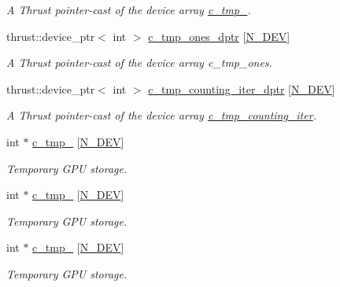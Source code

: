 \begin{DoxyCompactItemize}
\begin{DoxyCompactList}\small\item\em A Thrust pointer-\/cast of the device array \hyperlink{classMesh_af5270c410a5690f1763f5d593d0c9e35}{c\+\_\+tmp\+\_}. \end{DoxyCompactList}\item 
thrust\+::device\+\_\+ptr$<$ int $>$ \hyperlink{classMesh_a8112720b857381575b8c9c79983df670}{c\+\_\+tmp\+\_\+ones\+\_\+dptr} \mbox{[}\hyperlink{cppspec_8h_a2b674dab7a14f1bf32b48b7fda5022dc}{N\+\_\+\+D\+EV}\mbox{]}
\begin{DoxyCompactList}\small\item\em A Thrust pointer-\/cast of the device array c\+\_\+tmp\+\_\+ones. \end{DoxyCompactList}\item 
thrust\+::device\+\_\+ptr$<$ int $>$ \hyperlink{classMesh_a5d58a50232053a9d1991c812513deb14}{c\+\_\+tmp\+\_\+counting\+\_\+iter\+\_\+dptr} \mbox{[}\hyperlink{cppspec_8h_a2b674dab7a14f1bf32b48b7fda5022dc}{N\+\_\+\+D\+EV}\mbox{]}
\begin{DoxyCompactList}\small\item\em A Thrust pointer-\/cast of the device array \hyperlink{classMesh_a0db99bf87d3b79d642e99a7ffe23c6b5}{c\+\_\+tmp\+\_\+counting\+\_\+iter}. \end{DoxyCompactList}\item 
int $\ast$ \hyperlink{classMesh_a2d6d66223791e211c83a72f9114f8845}{c\+\_\+tmp\+\_} \mbox{[}\hyperlink{cppspec_8h_a2b674dab7a14f1bf32b48b7fda5022dc}{N\+\_\+\+D\+EV}\mbox{]}
\begin{DoxyCompactList}\small\item\em Temporary G\+PU storage. \end{DoxyCompactList}\item 
int $\ast$ \hyperlink{classMesh_a167ed8797ff5b96dc9c50fef4061abfb}{c\+\_\+tmp\+\_} \mbox{[}\hyperlink{cppspec_8h_a2b674dab7a14f1bf32b48b7fda5022dc}{N\+\_\+\+D\+EV}\mbox{]}
\begin{DoxyCompactList}\small\item\em Temporary G\+PU storage. \end{DoxyCompactList}\item 
int $\ast$ \hyperlink{classMesh_a7cdb75040bd5f280fd1b019ea99383ac}{c\+\_\+tmp\+\_} \mbox{[}\hyperlink{cppspec_8h_a2b674dab7a14f1bf32b48b7fda5022dc}{N\+\_\+\+D\+EV}\mbox{]}
\begin{DoxyCompactList}\small\item\em Temporary G\+PU storage. \end{DoxyCompactList}\item 

\end{DoxyCompactItemize}
